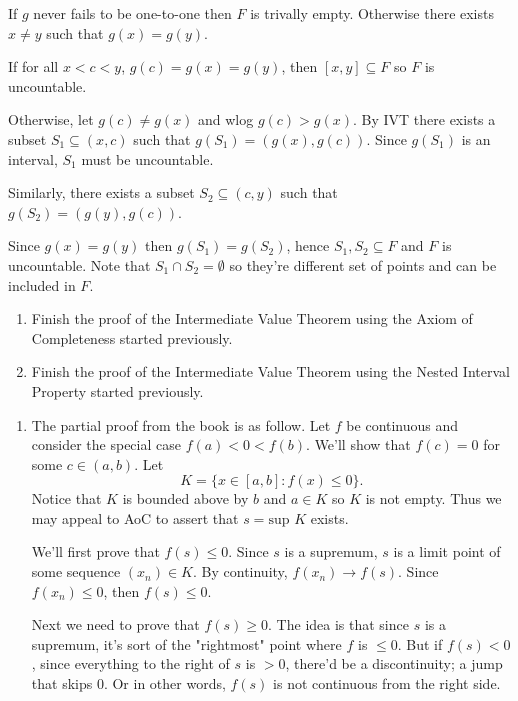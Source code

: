 \documentclass{oxmathproblems}
\begin{document}
\begin{questions}
\begin{solution}
  If $g$ never fails to be one-to-one then $F$ is trivally empty. Otherwise there exists $x \neq y$ such that $g(x)=g(y)$.
  
  If for all $x < c < y$, $g(c)=g(x)=g(y)$, then $[x, y] \subseteq F$ so $F$ is uncountable.

  Otherwise, let $g(c) \neq g(x)$ and wlog $g(c) > g(x)$. By IVT there exists a subset $S_{1} \subseteq (x, c)$ such that $g(S_{1}) = (g(x), g(c))$. Since $g(S_{1})$ is an interval, $S_{1}$ must be uncountable.
  
  Similarly, there exists a subset $S_{2} \subseteq (c, y)$ such that $g(S_{2})=(g(y), g(c))$.
  
  Since $g(x)=g(y)$ then $g(S_{1})=g(S_{2})$, hence $S_{1}, S_{2} \subseteq F$ and $F$ is uncountable.  Note that $S_{1} \cap S_{2} = \emptyset$ so they're different set of points
  and can be included in $F$.
\end{solution}

\miquestion
\begin{enumerate}[label=(\alph*)]
  \item Finish the proof of the Intermediate Value Theorem using the Axiom of Completeness started previously.
  \item Finish the proof of the Intermediate Value Theorem using the Nested Interval Property started previously.
\end{enumerate}

\begin{solution}
  \begin{enumerate}[label=(\alph*)]
    \item The partial proof from the book is as follow. Let $f$ be continuous and consider the special case $f(a) < 0 < f(b)$. We'll show that $f(c)=0$ for some $c \in (a, b)$. Let
    \[K = \{x \in [a, b] : f(x) \leq 0\}.\]
    Notice that $K$ is bounded above by $b$ and $a \in K$ so $K$ is not empty. Thus we may appeal to AoC to assert that $s=\text{sup }K$ exists.

    We'll first prove that $f(s) \leq 0$. Since $s$ is a supremum, $s$ is a limit point of some sequence $(x_{n}) \in K$. By continuity, $f(x_{n}) \to f(s)$. Since
    $f(x_{n}) \leq 0$, then $f(s) \leq 0$.

    Next we need to prove that $f(s) \geq 0$. The idea is that since $s$ is a supremum, it's sort of the "rightmost" point where $f$ is $\leq 0$. But if $f(s) < 0$,
    since everything to the right of $s$ is $> 0$, there'd be a discontinuity; a jump that skips 0. Or in other words, $f(s)$ is not continuous from the right side.


\end{enumerate}
\end{solution}
\end{questions}
\end{document}
